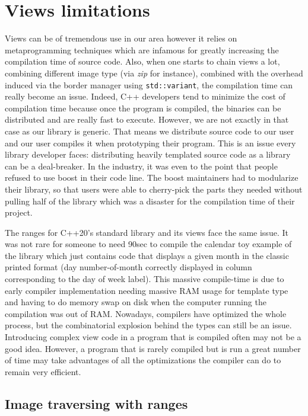 \section{Views limitations}

Views can be of tremendous use in our area however it relies on metaprogramming techniques which are infamous for
greatly increasing the compilation time of source code. Also, when one starts to chain views a lot, combining different
image type (via \emph{zip} for instance), combined with the overhead induced via the border manager using
\texttt{std::variant}, the compilation time can really become an issue. Indeed, C++ developers tend to minimize the cost
of compilation time because once the program is compiled, the binaries can be distributed and are really fast to
execute. However, we are not exactly in that case as our library is generic. That means we distribute source code to our
user and our user compiles it when prototyping their program. This is an issue every library developer faces:
distributing heavily templated source code as a library can be a deal-breaker. In the industry, it was even to the point
that people refused to use boost in their code line. The boost maintainers had to modularize their library, so that
users were able to cherry-pick the parts they needed without pulling half of the library which was a disaster for the
compilation time of their project.

The ranges for C++20's standard library and its views face the same issue. It was not rare for someone to need 90sec to
compile the calendar toy example of the library which just contains code that displays a given month in the classic
printed format (day number-of-month correctly displayed in column corresponding to the day of week label). This massive
compile-time is due to early compiler implementation needing massive RAM usage for template type and having to do memory
swap on disk when the computer running the compilation was out of RAM. Nowadays, compilers have optimized the whole
process, but the combinatorial explosion behind the types can still be an issue. Introducing complex view code in a
program that is compiled often may not be a good idea. However, a program that is rarely compiled but is run a great
number of time may take advantages of all the optimizations the compiler can do to remain very efficient.

\subsection{Image traversing with ranges}
\label{subsec.range.traversing}


